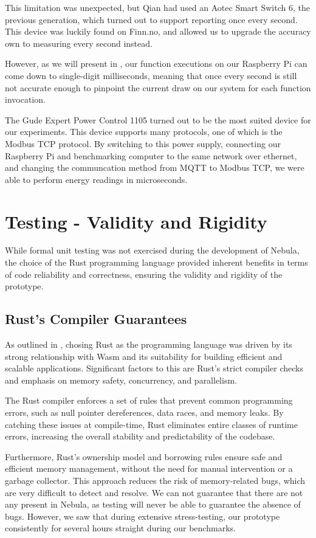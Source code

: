 \documentclass[
  table]{report}
\begin{document}
This limitation was unexpected, but Qian had used an Aotec Smart Switch
6, the previous generation, which turned out to support reporting once
every second. This device was luckily found on Finn.no, and allowed us
to upgrade the accuracy own to measuring every second instead.

However, as we will present in , our function
executions on our Raspberry Pi can come down to single-digit
milliseconds, meaning that once every second is still not accurate
enough to pinpoint the current draw on our system for each function
invocation.

The Gude Expert Power Control 1105 turned out to be the most suited
device for our experiments. This device supports many protocols, one of
which is the Modbus TCP protocol. By switching to this power supply,
connecting our Raspberry Pi and benchmarking computer to the same
network over ethernet, and changing the communcation method from
\ac{MQTT} to Modbus TCP, we were able to perform energy readings in
microseconds.

\section{Testing - Validity and Rigidity}

While formal unit testing was not exercised during the development of
Nebula, the choice of the Rust programming language provided inherent
benefits in terms of code reliability and correctness, ensuring the
validity and rigidity of the prototype.

\subsection{Rust's Compiler Guarantees}

As outlined in , chosing Rust as the programming
language was driven by its strong relationship with \ac{Wasm} and its
suitability for building efficient and scalable applications.
Significant factors to this are Rust's strict compiler checks and
emphasis on memory safety, concurrency, and parallelism.

The Rust compiler enforces a set of rules that prevent common
programming errors, such as null pointer dereferences, data races, and
memory leaks. By catching these issues at compile-time, Rust eliminates
entire classes of runtime errors, increasing the overall stability and
predictability of the codebase.

Furthermore, Rust's ownership model and borrowing rules ensure safe and
efficient memory management, without the need for manual intervention or
a garbage collector. This approach reduces the risk of memory-related
bugs, which are very difficult to detect and resolve. We can not
guarantee that there are not any present in Nebula, as testing will
never be able to guarantee the absence of bugs. However, we saw that
during extensive stress-testing, our prototype consistently for several
hours straight during our benchmarks.
\end{document}
